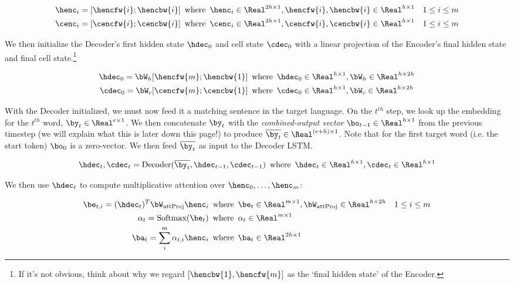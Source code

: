 \begin{align}
    \henc_i = [\hencfw{i}; \hencbw{i}] \enspace &\text{where}\enspace \henc_i \in \Real^{2h \times 1}, \hencfw{i},\hencbw{i} \in \Real^{h \times 1} &1 \le i \le m \\
    \cenc_i = [\cencfw{i};\cencbw{i}] \enspace &\text{where} \enspace \cenc_i \in \Real^{2h \times 1}, \cencfw{i},\cencbw{i} \in \Real^{h \times 1} &1 \le i \le m
\end{align}

We then initialize the Decoder's first hidden state $\hdec_0$ and cell state $\cdec_0$ with a linear projection of the Encoder's final hidden state and final cell state.\footnote{If it's not obvious, think about why we regard $[\hencbw{1}, \hencfw{m}]$ as the `final hidden state' of the Encoder.}

\begin{align}
    \hdec_0 = \bW_{h}[\hencfw{m};\hencbw{1}] \enspace &\text{where} \enspace \hdec_0 \in \Real^{h \times 1}, \bW_{h} \in \Real^{h \times 2h}\\
    \cdec_0 = \bW_{c}[\cencfw{m};\cencbw{1}] \enspace &\text{where} \enspace \cdec_0 \in \Real^{h \times 1}, \bW_{c} \in \Real^{h \times 2h}
\end{align}

With the Decoder initialized, we must now feed it a matching sentence in the target language. On the $t^{th}$ step, we look up the embedding for the $t^{th}$ word,  $\by_t \in \Real^{e \times 1}$. We then concatenate $\by_t$ with the \textit{combined-output vector} $\bo_{t-1} \in \Real^{h \times 1}$ from the previous timestep (we will explain what this is later down this page!\@) to produce $\overline{\by_t} \in \Real^{(e+h) \times 1}$. Note that for the first target word (i.e. the start token) $\bo_{0}$ is a zero-vector. We then feed $\overline{\by_t}$ as input to the Decoder LSTM.

\begin{align}
    \hdec_t, \cdec_t = \text{Decoder}(\overline{\by_t}, \hdec_{t-1}, \cdec_{t-1}) \enspace &\text{where} \enspace \hdec_t \in \Real^{h \times 1}, \cdec_t \in \Real^{h \times 1}\\
\end{align}

We then use $\hdec_t$ to compute  multiplicative attention over $\henc_0, \dots, \henc_m$:

\begin{align}
    \be_{t, i} = (\hdec_t)^T\bW_{\text{attProj}}\henc_i \enspace &\text{where} \enspace \be_{t} \in \Real^{m \times 1}, \bW_{\text{attProj}}\in \Real^{h \times 2h} & 1 \le i \le m \\
    \alpha_t= \text{Softmax}(\be_t) \enspace &\text{where} \enspace \alpha_t \in \Real^{m \times 1}\\
    \ba_t = \sum_{i}^{m}\alpha_{t,i}\henc_i \enspace &\text{where} \enspace \ba_t \in \Real^{2h \times 1}
\end{align}    
 
